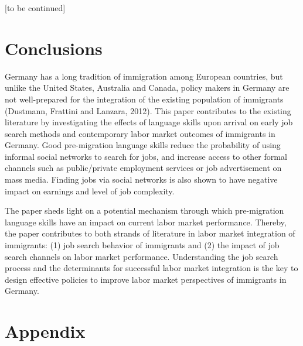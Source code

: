 \documentclass[12pt,a4paper]{article}
\begin{document}
\begin{center}
[to be continued]
\end{center} 

\section{Conclusions}

Germany has a long tradition of immigration among European countries, but unlike the United States, Australia and Canada, policy makers in Germany are not well-prepared for the integration of the existing population of immigrants (Dustmann, Frattini and Lanzara, 2012). This paper contributes to the existing literature by investigating the effects of language skills upon arrival on early job search methods and contemporary labor market outcomes of immigrants in Germany. Good pre-migration language skills reduce the probability of using informal social networks to search for jobs, and increase access to other formal channels such as public/private employment services or job advertisement on mass media. Finding jobs via social networks is also shown to have negative impact on earnings and level of job complexity.

The paper sheds light on a potential mechanism through which pre-migration language skills have an impact on current labor market performance. Thereby, the paper contributes to both strands of literature in labor market integration of immigrants: (1) job search behavior of immigrants and (2) the impact of job search channels on labor market performance. Understanding the job search process and the determinants for successful labor market integration is the key to design effective policies to improve labor market perspectives of immigrants in Germany.

\section{Appendix}
\end{document}
